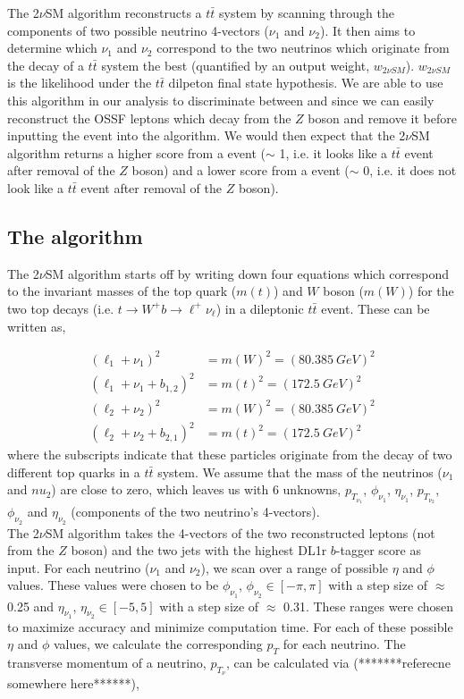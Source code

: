 The 2$\nu$SM algorithm reconstructs a $t\bar{t}$ system by scanning through the components of two possible neutrino 4-vectors ($\nu_{1}$ and $\nu_{2}$). It then aims to determine which $\nu_{1}$ and $\nu_{2}$ correspond to the two neutrinos which originate from the decay of a $t\bar{t}$ system the best (quantified by an output weight, $w_{2\nu SM}$). $w_{2\nu SM}$ is the likelihood under the $t\bar{t}$ dilpeton final state hypothesis. We are able to use this algorithm in our analysis to discriminate between \tWZ and \ttZ since we can easily reconstruct the OSSF leptons which decay from the $Z$ boson and remove it before inputting the event into the algorithm. We would then expect that the 2$\nu$SM algorithm returns a higher score from a \ttZ event ($\sim$ 1, i.e. it looks like a $t\bar{t}$ event after removal of the $Z$ boson) and a lower score from a \tWZ event ($\sim$ 0, i.e. it does not look like a $t\bar{t}$ event after removal of the $Z$ boson).
\subsection{The algorithm}
The 2$\nu$SM algorithm starts off by writing down four equations which correspond to the invariant masses of the top quark ($m(t)$) and $W$ boson ($m(W)$) for the two top decays (i.e. $t\rightarrow W^{+}b \rightarrow \ell^{+} \nu_{\ell}$) in a dileptonic $t\bar{t}$ event. These can be written as,

\begin{align}
    (\ell_{1} + \nu_{1})^{2} &= m(W)^{2} = (\SI{80.385}{GeV})^2\\
    (\ell_{1} + \nu_{1} + b_{1,2})^{2} &= m(t)^{2} = (\SI{172.5}{GeV})^{2}\\
    (\ell_{2} + \nu_{2})^{2} &= m(W)^{2} = (\SI{80.385}{GeV})^2\\
       (\ell_{2} + \nu_{2} + b_{2,1})^{2} &= m(t)^{2} = (\SI{172.5}{GeV})^{2}
\end{align}
where the subscripts indicate that these particles originate from the decay of two different top quarks in a $t\bar{t}$ system. We assume that the mass of the neutrinos ($\nu_{1}$ and $nu_{2}$) are close to zero, which leaves us with 6 unknowns, $p_{{T}_{\nu_{1}}}$, $\phi_{\nu_{1}}$, $\eta_{\nu_{1}}$, $p_{{T}_{\nu_{2}}}$, $\phi_{\nu_{2}}$ and $\eta_{\nu_{2}}$ (components of the two neutrino's 4-vectors).\\

The 2$\nu$SM algorithm takes the 4-vectors of the two reconstructed leptons (not from the $Z$ boson) and the two jets with the highest DL1r $b$-tagger score as input. For each neutrino ($\nu_{1}$ and $\nu_{2}$), we scan over a range of possible $\eta$ and $\phi$ values. These values were chosen to be $\phi_{\nu_{1}}$, $\phi_{\nu_{2}} \in [-\pi,\pi]$ with a step size of $\approx$ 0.25 and $\eta_{\nu_{1}}$, $\eta_{\nu_{2}} \in [-5,5]$ with a step size of $\approx$ 0.31. These ranges were chosen to maximize accuracy and minimize computation time. For each of these possible $\eta$ and $\phi$ values, we calculate the corresponding $p_{T}$ for each neutrino. The transverse momentum of a neutrino, $p_{{T}_{\nu}}$, can be calculated via (*******referecne somewhere here******),

